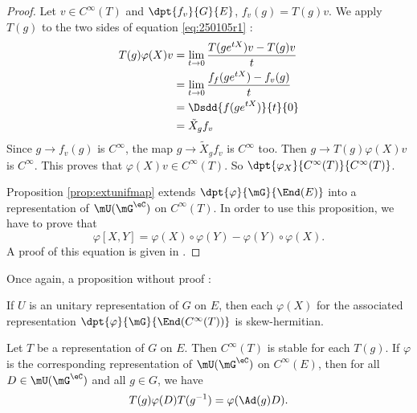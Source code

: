 \begin{proof}
Let $v\in C^{\infty}(T)$ and $\dpt{f_v}{G}{E}$, $f_v(g)=T(g)v$. We apply $T(g)$ to the two sides of equation \eqref{eq:250105r1} :
\begin{equation}
\begin{split}
T(g)\varphi(X)v&=\lim_{t\to 0}\frac{T(ge^{tX})v-T(g)v}{t}\\
		&=\lim_{t\to0}\frac{f_f(ge^{tX})-f_v(g)}{t}\\
		&=\Dsdd{ f(ge^{tX}) }{t}{0}\\
		&=\tilde X_gf_v
\end{split}
\end{equation}
Since $g\to f_v(g)$ is $ C^{\infty}$, the map $g\to\tilde X_gf_v$ is $ C^{\infty}$ too. Then $g\to T(g)\varphi(X)v$ is $ C^{\infty}$. This proves that $\varphi(X)v\in C^{\infty}(T)$. So $\dpt{\varphi_X}{ C^{\infty}(T)}{ C^{\infty}(T)}$.

Proposition \ref{prop:extunifmap} extends $\dpt{\varphi}{\mG}{\End(E)}$ into a representation of $\mU(\mG^{\eC})$ on $ C^{\infty}(T)$. In order to use this proposition, we have to prove that 
\[ 
  \varphi[X,Y]=\varphi(X)\circ\varphi(Y)-\varphi(Y)\circ\varphi(X).
\]
A proof of this equation is given in \cite{Knapp_reprez}.

 
\end{proof}	
Once again, a proposition without proof :

\begin{proposition}
 If $U$ is an unitary representation of $G$ on $E$, then each $\varphi(X)$ for the associated representation $\dpt{\varphi}{\mG}{\End( C^{\infty}(T))}$ is skew-hermitian.
\end{proposition}


\begin{proposition}
Let $T$ be a representation of $G$ on $E$. Then $ C^{\infty}(T)$ is stable for each $T(g)$. If $\varphi$ is the corresponding representation of $\mU(\mG^{\eC})$ on $ C^{\infty}(E)$, then for all $D\in\mU(\mG^{\eC})$ and all $g\in G$, we have
\[ 
  T(g)\varphi(D)T(g^{-1})=\varphi(\Ad(g)D).
\]
\end{proposition}

